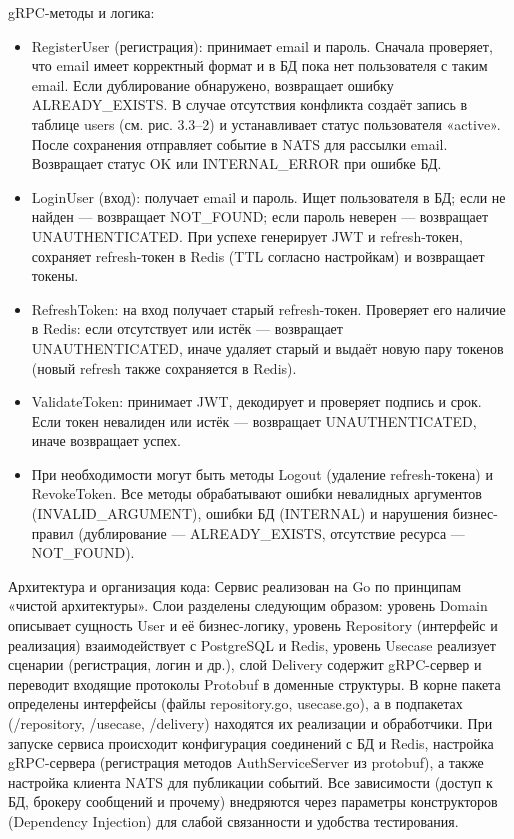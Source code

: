 gRPC-методы и логика:
\begin{itemize}
    \item RegisterUser (регистрация): принимает email и пароль. Сначала проверяет, что email имеет корректный формат и в БД пока нет пользователя с таким email. Если дублирование обнаружено, возвращает ошибку ALREADY\_EXISTS. В случае отсутствия конфликта создаёт запись в таблице users (см. рис. 3.3–2) и устанавливает статус пользователя «active». После сохранения отправляет событие в NATS для рассылки email. Возвращает статус OK или INTERNAL\_ERROR при ошибке БД.
    \item LoginUser (вход): получает email и пароль. Ищет пользователя в БД; если не найден — возвращает NOT\_FOUND; если пароль неверен — возвращает UNAUTHENTICATED. При успехе генерирует JWT и refresh-токен, сохраняет refresh-токен в Redis (TTL согласно настройкам) и возвращает токены.
    \item RefreshToken: на вход получает старый refresh-токен. Проверяет его наличие в Redis: если отсутствует или истёк — возвращает \\ UNAUTHENTICATED, иначе удаляет старый и выдаёт новую пару токенов (новый refresh также сохраняется в Redis).
    \item ValidateToken: принимает JWT, декодирует и проверяет подпись и срок. Если токен невалиден или истёк — возвращает UNAUTHENTICATED, иначе возвращает успех.
    \item При необходимости могут быть методы Logout (удаление refresh-токена) и RevokeToken. Все методы обрабатывают ошибки невалидных аргументов (INVALID\_ARGUMENT), ошибки БД (INTERNAL) и нарушения бизнес-правил (дублирование — ALREADY\_EXISTS, отсутствие ресурса — NOT\_FOUND).
\end{itemize}
\noindent Архитектура и организация кода: Сервис реализован на Go по принципам «чистой архитектуры». Слои разделены следующим образом: уровень Domain описывает сущность User и её бизнес-логику, уровень Repository (интерфейс и реализация) взаимодействует с PostgreSQL и Redis, уровень Usecase реализует сценарии (регистрация, логин и др.), слой Delivery содержит gRPC-сервер и переводит входящие протоколы Protobuf в доменные структуры. В корне пакета определены интерфейсы (файлы repository.go, usecase.go), а в подпакетах (/repository, /usecase, /delivery) находятся их реализации и обработчики. При запуске сервиса происходит конфигурация соединений с БД и Redis, настройка gRPC-сервера (регистрация методов AuthServiceServer из protobuf), а также настройка клиента NATS для публикации событий. Все зависимости (доступ к БД, брокеру сообщений и прочему) внедряются через параметры конструкторов (Dependency Injection) для слабой связанности и удобства тестирования.

